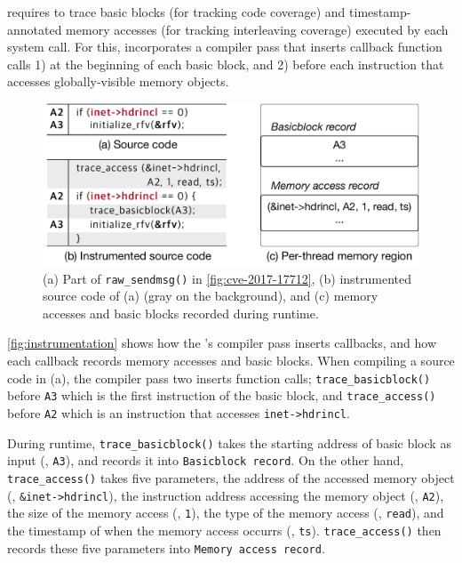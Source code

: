 \sys requires to trace basic blocks (for tracking code coverage) and
timestamp-annotated memory accesses (for tracking interleaving
coverage) executed by each system call.
%
For this, \sys incorporates a compiler pass that inserts callback
function calls 1) at the beginning of each basic block, and 2) before
each instruction that accesses globally-visible memory objects.
%



\begin{figure}
  \centering
  \includegraphics[width=0.9\linewidth]{fig/instrumentation.pdf}
  \caption{(a) Part of \texttt{raw_sendmsg()} in
    \autoref{fig:cve-2017-17712}, (b) instrumented source code of (a)
    (gray on the background), and (c) memory accesses and basic blocks
    recorded during runtime.}
  \label{fig:instrumentation}
\end{figure}

\autoref{fig:instrumentation} shows how the \sys's compiler pass
inserts callbacks, and how each callback records memory accesses and
basic blocks.
%
When compiling a source code in (a), the compiler pass two inserts
function calls; \texttt{trace_basicblock()} before \texttt{A3} which
is the first instruction of the basic block, and
\texttt{trace_access()} before \texttt{A2} which is an instruction
that accesses \texttt{inet->hdrincl}.


During runtime, \texttt{trace_basicblock()} takes the starting address
of basic block as input (\ie, \texttt{A3}), and records it into
\texttt{Basicblock record}.
%
On the other hand, \texttt{trace_access()} takes five parameters, the
address of the accessed memory object (\ie, \texttt{\&inet->hdrincl}),
the instruction address accessing the memory object (\ie,
\texttt{A2}), the size of the memory access (\ie, \texttt{1}), the
type of the memory access (\ie, \texttt{read}), and the timestamp of
when the memory access occurrs (\ie, \texttt{ts}).
%
\texttt{trace_access()} then records these five parameters into
\texttt{Memory access record}.






